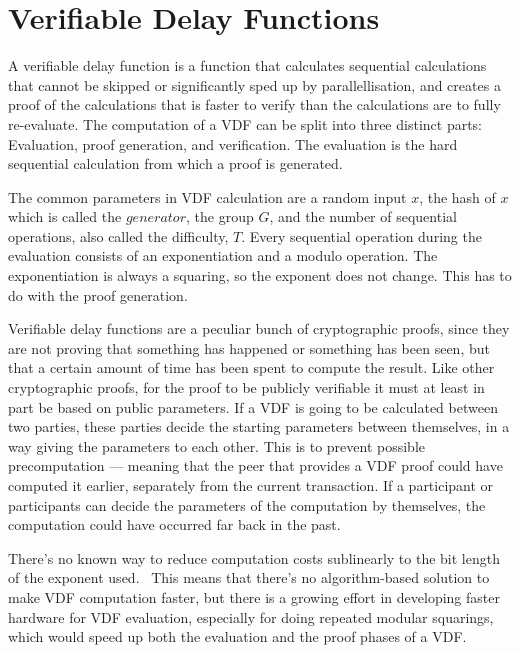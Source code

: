 \section{Verifiable Delay Functions}

A verifiable delay function is a function that calculates sequential calculations that cannot be skipped or significantly sped up by parallellisation, and creates a proof of the calculations that is faster to verify than the calculations are to fully re-evaluate. The computation of a VDF can be split into three distinct parts: Evaluation, proof generation, and verification. The evaluation is the hard sequential calculation from which a proof is generated.~\cite{Boneh2018-sm}

The common parameters in VDF calculation are a random input \(x\), the hash of \(x\) which is called the \(generator\), the group \(G\), and the number of sequential operations, also called the difficulty, \(T\). Every sequential operation during the evaluation consists of an exponentiation and a modulo operation. The exponentiation is always a squaring, so the exponent does not change. This has to do with the proof generation.


Verifiable delay functions are a peculiar bunch of cryptographic proofs, since they are not proving that something has happened or something has been seen, but that a certain amount of time has been spent to compute the result. Like other cryptographic proofs, for the proof to be publicly verifiable it must at least in part be based on public parameters. If a VDF is going to be calculated between two parties, these parties decide the starting parameters between themselves, in a way giving the parameters to each other. This is to prevent possible precomputation --- meaning that the peer that provides a VDF proof could have computed it earlier, separately from the current transaction. If a participant or participants can decide the parameters of the computation by themselves, the computation could have occurred far back in the past.

There's no known way to reduce computation costs sublinearly to the bit length of the exponent used.~\cite{Boneh2018-sm} This means that there's no algorithm-based solution to make VDF computation faster, but there is a growing effort in developing faster hardware for VDF evaluation, especially for doing repeated modular squarings, which would speed up both the evaluation and the proof phases of a VDF.~\cite{noauthor_undated-jb, noauthor_undated-da, noauthor_2020-ki}

